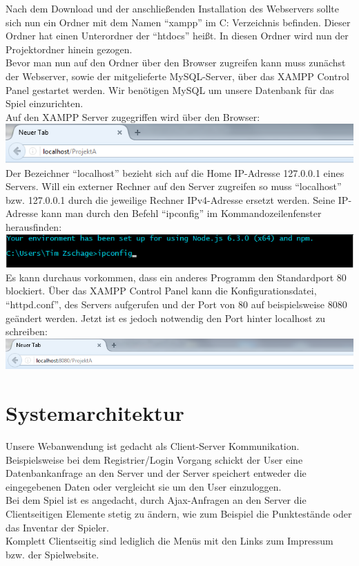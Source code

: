 \documentclass[a4paper]{scrreprt}
\begin{document}
Nach dem Download und der anschließenden Installation des Webservers sollte sich nun ein Ordner mit dem Namen "`xampp"' im C: Verzeichnis befinden. Dieser Ordner hat einen Unterordner der "`htdocs"' heißt. In diesen Ordner wird nun der Projektordner hinein gezogen. \\
Bevor man nun auf den Ordner über den Browser zugreifen kann muss zunächst der Webserver, sowie der mitgelieferte MySQL-Server, über das XAMPP Control Panel gestartet werden. Wir benötigen MySQL um unsere Datenbank für das Spiel einzurichten. \\
Auf den XAMPP Server zugegriffen wird über den Browser:\\
\includegraphics[scale=0.8]{browser_localhost}\\
Der Bezeichner "`localhost"' bezieht sich auf die Home IP-Adresse 127.0.0.1 eines Servers. Will ein externer Rechner auf den Server zugreifen so muss "`localhost"' bzw. 127.0.0.1 durch die jeweilige Rechner IPv4-Adresse ersetzt werden.
Seine IP-Adresse kann man durch den Befehl "`ipconfig"' im Kommandozeilenfenster herausfinden:\\
\includegraphics[scale=0.8]{ipconfig}\\
\linebreak
Es kann durchaus vorkommen, dass ein anderes Programm den Standardport 80 blockiert. 
Über das XAMPP Control Panel kann die Konfigurationsdatei, "`httpd.conf"', des Servers aufgerufen und der Port von 80 auf beispielsweise 8080 geändert werden.
Jetzt ist es jedoch notwendig den Port hinter localhost zu schreiben:\\
\includegraphics[scale=0.8]{browser_port}\\

\chapter{Systemarchitektur}
Unsere Webanwendung ist gedacht als Client-Server Kommunikation. Beispielsweise bei dem Registrier/Login Vorgang schickt der User eine Datenbankanfrage an den Server und der Server speichert entweder die eingegebenen Daten oder vergleicht sie um den User einzuloggen.\\
Bei dem Spiel ist es angedacht, durch Ajax-Anfragen an den Server die Clientseitigen Elemente stetig zu ändern, wie zum Beispiel die Punktestände oder das Inventar der Spieler.\\
Komplett Clientseitig sind lediglich die Menüs mit den Links zum Impressum bzw. der Spielwebsite.
\end{document}
